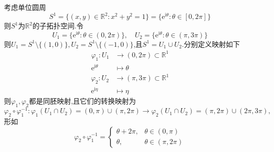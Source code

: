 考虑单位圆周
$$
S^1=\{(x,y)\in\mathbb{R}^2:x^2+y^2=1\}=\{\mathrm{e}^{\mathrm{i}\theta}:\theta\in[0,2\pi]\}
$$
则$S^1$为$\mathbb{R}^2$的子拓扑空间.令
$$
U_1=\{\mathrm{e}^{\mathrm{i}\theta}:\theta\in(0,2\pi)\},\quad U_2=\{\mathrm{e}^{\mathrm{i}\theta}:\theta\in(\pi,3\pi)\}
$$
则$U_1=S^1\setminus\{(1,0)\},U_2=S^1\setminus\{(-1,0)\}$,且$S^1=U_1\cup U_2$.分别定义映射如下
$$
\begin{aligned}
    \varphi_1:U_1&\to (0,2\pi)\subset \mathbb{R}^1\\
    \mathrm{e}^{\mathrm{i}\theta}&\mapsto \theta
\end{aligned}
$$
$$
\begin{aligned}
    \varphi_2:U_2&\to (\pi,3\pi)\subset \mathbb{R}^1\\
    \mathrm{e}^{\mathrm{i}\eta}&\mapsto \eta
\end{aligned}
$$
则$\varphi_1,\varphi_2$都是同胚映射,且它们的转换映射为
$$
\varphi_2\circ \varphi_1^{-1}:\varphi_1(U_1\cap U_2)=(0,\pi)\cup(\pi,2\pi)\to \varphi_2(U_1\cap U_2)=(\pi,2\pi)\cup (2\pi,3\pi),
$$
形如
$$
\varphi_2\circ \varphi_1^{-1}=
\begin{cases}
    \theta+2\pi, & \theta\in(0,\pi)\\[3pt]
    \theta, & \theta\in(\pi,2\pi)
\end{cases}
$$


































